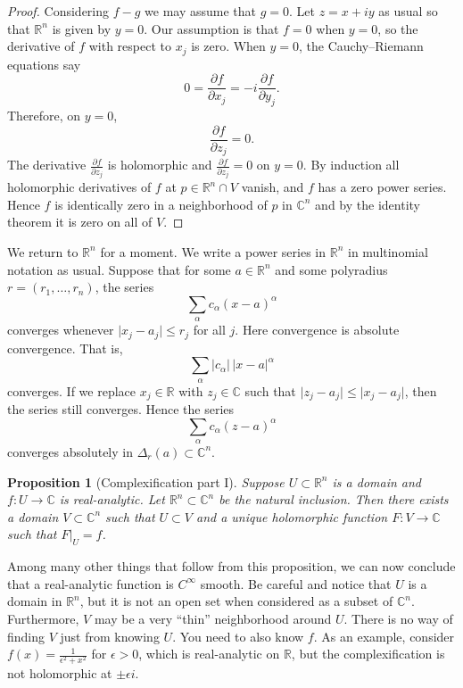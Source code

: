 \documentclass[12pt,openany]{book}
\newcommand{\sabs}[1]{\lvert {#1} \rvert}
\newcommand{\C}{{\mathbb{C}}}
\newcommand{\R}{{\mathbb{R}}}
\theoremstyle{plain}
\newtheorem{prop}[thm]{Proposition}
\theoremstyle{remark}
\theoremstyle{definition}
\theoremstyle{exercise}
\theoremstyle{example}
\begin{document}
\begin{proof}
Considering $f-g$ we may assume that $g=0$.
Let $z = x+iy$ as usual so that $\R^n$ is given by $y=0$.
Our assumption is that $f = 0$ when $y=0$,
so the derivative of $f$ with respect to $x_j$ is zero.
When $y=0$,
the Cauchy--Riemann equations say
\begin{equation*}
0 = \frac{\partial f}{\partial x_j} =
-i \frac{\partial f}{\partial y_j} .
\end{equation*}
Therefore, on $y=0$,
\begin{equation*}
\frac{\partial f }{\partial z_j} = 0 .
\end{equation*}
The derivative $\frac{\partial f }{\partial z_j}$ is holomorphic
and $\frac{\partial f }{\partial z_j} = 0$ on $y=0$.
By induction all holomorphic derivatives of $f$ at $p \in \R^n \cap V$ vanish,
and $f$ has a zero 
power series.  Hence $f$ is identically zero in a neighborhood of
$p$ in $\C^n$ and by the identity theorem it is zero on all of $V$.
\end{proof}


We return to $\R^n$ for a moment.
We write a power series in $\R^n$ in multinomial notation as usual.
Suppose that for some
$a \in \R^n$
and some polyradius
$r=(r_1,\ldots,r_n)$,
the series
\begin{equation*}
\sum_{\alpha} c_{\alpha} {(x-a)}^\alpha
\end{equation*}
converges whenever $\sabs{x_j-a_j} \leq r_j$ for all $j$.
Here convergence is absolute convergence.  That is,
\begin{equation*}
\sum_{\alpha} \sabs{c_{\alpha}}\, \sabs{x-a}^\alpha
\end{equation*}
converges.
If we replace $x_j \in \R$ with $z_j \in \C$ such that
$\sabs{z_j-a_j} \leq \sabs{x_j-a_j}$, then the series still converges.
Hence the series
\begin{equation*}
\sum_{\alpha} c_{\alpha} {(z-a)}^\alpha
\end{equation*}
converges absolutely in $\Delta_r(a) \subset \C^n$.

\begin{prop}[Complexification part I]
Suppose $U \subset \R^n$ is a domain and
$f \colon U \to \C$ is real-analytic.
Let $\R^n \subset \C^n$ be the natural inclusion.
Then there exists a domain $V \subset \C^n$ such that $U \subset V$
and a unique holomorphic function $F \colon V \to \C$ such that $F|_U = f$.
\end{prop}

Among many other things that follow from this proposition, we
can now conclude that a real-analytic function is $C^\infty$ smooth.  Be careful
and notice that $U$ is a domain in $\R^n$, but it is not an open set
when considered as a subset of $\C^n$.  Furthermore, $V$ may be a very
``thin'' neighborhood around $U$.  There is no way of finding $V$ just from
knowing $U$.  You need to also know $f$.
As an example, consider
$f(x) = \frac{1}{\epsilon^2+x^2}$ for $\epsilon > 0$, which is
real-analytic on $\R$, but the complexification is not holomorphic at $\pm
\epsilon i$.
\end{document}
